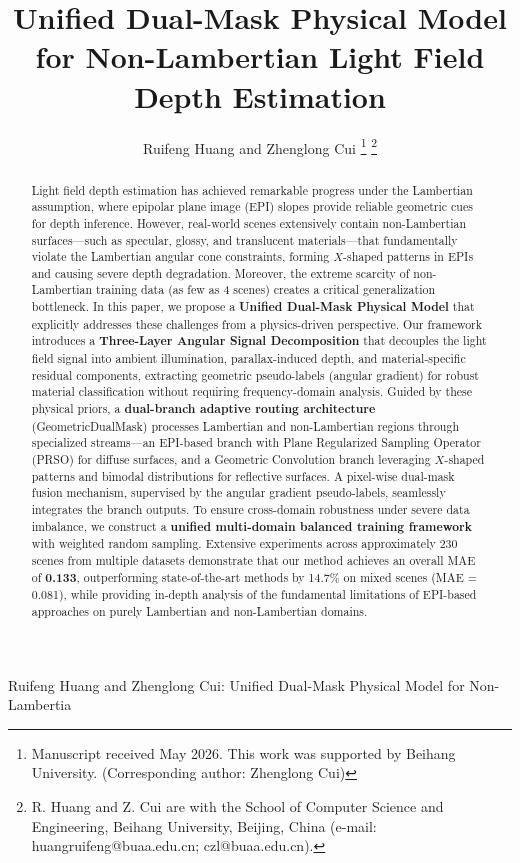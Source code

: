 \documentclass[lettersize,journal]{IEEEtran}
\begin{document}
\title{Unified Dual-Mask Physical Model for Non-Lambertian Light Field Depth Estimation}

\author{Ruifeng Huang and Zhenglong Cui
\thanks{Manuscript received May 2026. This work was supported by Beihang University. (Corresponding author: Zhenglong Cui)}
\thanks{R. Huang and Z. Cui are with the School of Computer Science and Engineering, Beihang University, Beijing, China (e-mail: huangruifeng@buaa.edu.cn; czl@buaa.edu.cn).}}

%
{Ruifeng Huang and Zhenglong Cui: Unified Dual-Mask Physical Model for Non-Lambertia}

\maketitle

\begin{abstract}
Light field depth estimation has achieved remarkable progress under the Lambertian assumption, where epipolar plane image (EPI) slopes provide reliable geometric cues for depth inference. However, real-world scenes extensively contain non-Lambertian surfaces---such as specular, glossy, and translucent materials---that fundamentally violate the Lambertian angular cone constraints, forming $X$-shaped patterns in EPIs and causing severe depth degradation. Moreover, the extreme scarcity of non-Lambertian training data (as few as 4 scenes) creates a critical generalization bottleneck. In this paper, we propose a \textbf{Unified Dual-Mask Physical Model} that explicitly addresses these challenges from a physics-driven perspective. Our framework introduces a \textbf{Three-Layer Angular Signal Decomposition} that decouples the light field signal into ambient illumination, parallax-induced depth, and material-specific residual components, extracting geometric pseudo-labels (angular gradient) for robust material classification without requiring frequency-domain analysis. Guided by these physical priors, a \textbf{dual-branch adaptive routing architecture} (GeometricDualMask) processes Lambertian and non-Lambertian regions through specialized streams---an EPI-based branch with Plane Regularized Sampling Operator (PRSO) for diffuse surfaces, and a Geometric Convolution branch leveraging $X$-shaped patterns and bimodal distributions for reflective surfaces. A pixel-wise dual-mask fusion mechanism, supervised by the angular gradient pseudo-labels, seamlessly integrates the branch outputs. To ensure cross-domain robustness under severe data imbalance, we construct a \textbf{unified multi-domain balanced training framework} with weighted random sampling. Extensive experiments across approximately 230 scenes from multiple datasets demonstrate that our method achieves an overall MAE of \textbf{0.133}, outperforming state-of-the-art methods by 14.7\% on mixed scenes (MAE = 0.081), while providing in-depth analysis of the fundamental limitations of EPI-based approaches on purely Lambertian and non-Lambertian domains.
\end{abstract}
\end{document}
